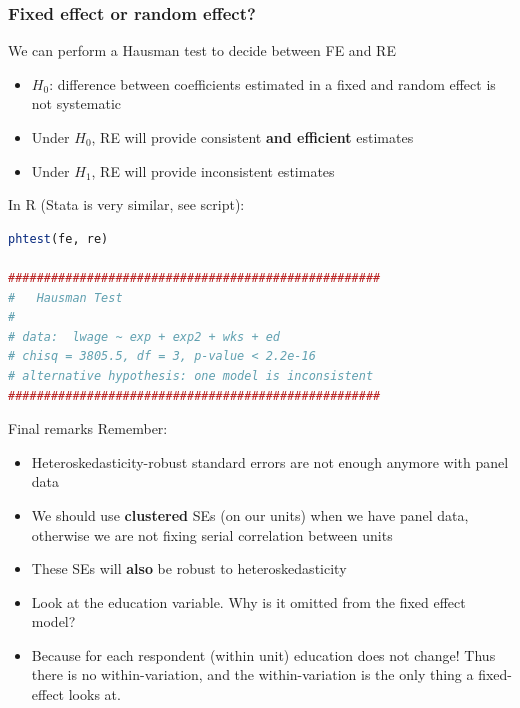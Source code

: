 \documentclass[xcolor=table,dvipsnames]{beamer}
\begin{document}
\begin{frame}[fragile]
\frametitle{Fixed effect or random effect?}
We can perform a Hausman test to decide between FE and RE \pause
\begin{itemize}
\item $H_0$: difference between coefficients estimated in a fixed and random effect is not systematic \pause
\item Under $H_0$, RE will provide consistent \textbf{and efficient} estimates \pause
\item Under $H_1$, RE will provide inconsistent estimates \pause
\end{itemize}
In R (Stata is very similar, see script):
\begin{lstlisting}[language=R]
phtest(fe, re)

####################################################
# 	Hausman Test
#
# data:  lwage ~ exp + exp2 + wks + ed
# chisq = 3805.5, df = 3, p-value < 2.2e-16
# alternative hypothesis: one model is inconsistent
####################################################
\end{lstlisting}
\end{frame}

\begin{frame}{Final remarks}
Remember:
\begin{itemize}
\item Heteroskedasticity-robust standard errors are not enough anymore with panel data \pause
\item We should use \textbf{clustered} SEs (on our units) when we have panel data, otherwise we are not fixing serial correlation between units \pause
\item These SEs will \textbf{also} be robust to heteroskedasticity \pause
\item Look at the education variable. Why is it omitted from the fixed effect model? \pause 
\item Because for each respondent (within unit) education does not change! Thus there is no within-variation, and the within-variation is the only thing a fixed-effect looks at.
\end{itemize}
\end{frame}

\end{document}
